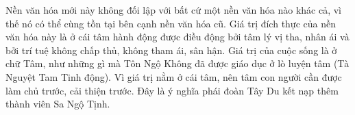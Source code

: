 Nền văn hóa mới này không đối lập với bất cứ một nền văn hóa nào khác cả, vì thế nó có thể cùng tồn tại bên cạnh nền văn hóa cũ. Giá trị đích thực của nền văn hóa này là ở cái tâm hành động được điều động bởi tâm lý vị tha, nhân ái và bởi trí tuệ không chấp thủ, không tham ái, sân hận. Giá trị của cuộc sống là ở chữ Tâm, như những gì mà Tôn Ngộ Không đã được giáo dục ở lò luyện tâm (Tà Nguyệt Tam Tinh động). Vì giá trị nằm ở cái tâm, nên tâm con người cần được làm chủ trước, cải thiện trước. Đây là ý nghĩa phái đoàn Tây Du kết nạp thêm thành viên Sa Ngộ Tịnh.
